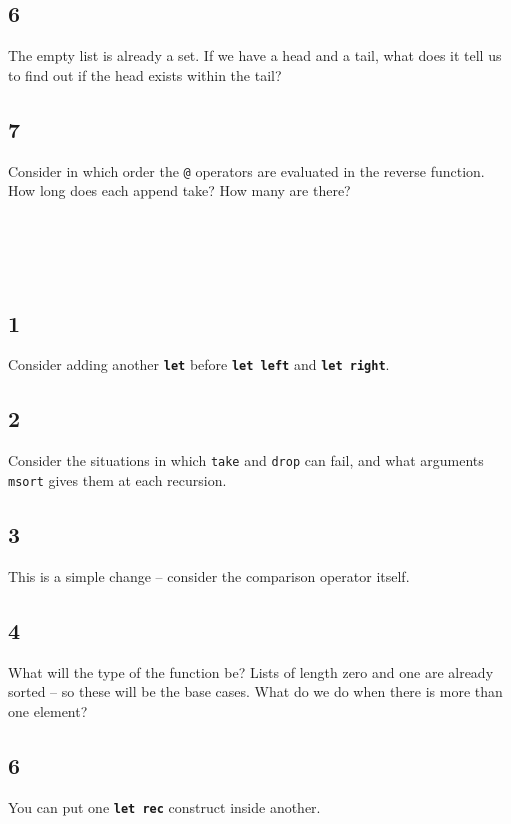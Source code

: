 \documentclass[]{book}
\begin{document}
\begin{multicols*}{2}
\subsection*{6}
The empty list is already a set. If we have a head and a tail, what does it tell us to find out if the head exists within the tail?
\subsection*{7}
Consider in which order the \texttt{@} operators are evaluated in the reverse function. How long does each append take? How many are there?

\section*{\\ }
\subsection*{1}
Consider adding another \texttt{\textbf{let}} before \texttt{\textbf{let\!\! \textmd{left}}} and \texttt{\textbf{let\!\! \textmd{right}}}.

\subsection*{2}
Consider the situations in which \texttt{take} and \texttt{drop} can fail, and what arguments \texttt{msort} gives them at each recursion.

\subsection*{3}
This is a simple change -- consider the comparison operator itself.

\subsection*{4}
What will the type of the function be? Lists of length zero and one are already sorted -- so these will be the base cases. What do we do when there is more than one element?

\subsection*{6}
You can put one \texttt{\textbf{let\!\! rec}} construct inside another.


\end{multicols*}
\end{document}
